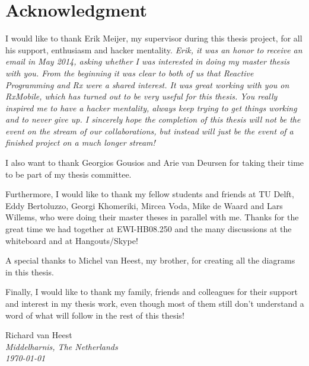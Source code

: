 \chapter*{Acknowledgment}

I would like to thank Erik Meijer, my supervisor during this thesis project, for all his support, enthusiasm and hacker mentality. \textit{Erik, it was an honor to receive an email in May 2014, asking whether I was interested in doing my master thesis with you. From the beginning it was clear to both of us that Reactive Programming and Rx were a shared interest. It was great working with you on RxMobile, which has turned out to be very useful for this thesis. You really inspired me to have a hacker mentality, always keep trying to get things working and to never give up. I sincerely hope the completion of this thesis will not be the  event on the stream of our collaborations, but instead will just be the  event of a finished project on a much longer stream!}

I also want to thank Georgios Gousios and Arie van Deursen for taking their time to be part of my thesis committee.

Furthermore, I would like to thank my fellow students and friends at TU Delft, Eddy Bertoluzzo, Georgi Khomeriki, Mircea Voda, Mike de Waard and Lars Willems, who were doing their master theses in parallel with me. Thanks for the great time we had together at EWI-HB08.250 and the many discussions at the whiteboard and at Hangouts/Skype!

A special thanks to Michel van Heest, my brother, for creating all the diagrams in this thesis.

Finally, I would like to thank my family, friends and colleagues for their support and interest in my thesis work, even though most of them still don't understand a word of what will follow in the rest of this thesis!

\begin{flushright}
Richard van Heest\\
\textit{Middelharnis, The Netherlands}\\
\textit{\monthyeardate\today}
\end{flushright}